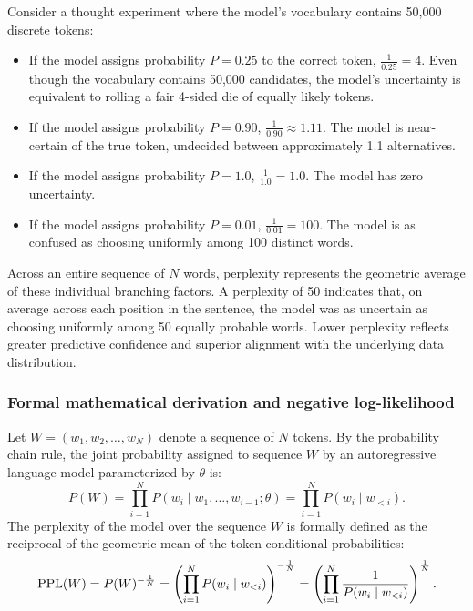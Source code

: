 \documentclass[../../../main.tex]{subfiles}
\begin{document}
Consider a thought experiment where the model's vocabulary contains 50,000 discrete tokens:
\begin{itemize}
    \item If the model assigns probability $P = 0.25$ to the correct token, $\frac{1}{0.25} = 4$. Even though the vocabulary contains 50,000 candidates, the model's uncertainty is equivalent to rolling a fair 4-sided die of equally likely tokens.
    \item If the model assigns probability $P = 0.90$, $\frac{1}{0.90} \approx 1.11$. The model is near-certain of the true token, undecided between approximately 1.1 alternatives.
    \item If the model assigns probability $P = 1.0$, $\frac{1}{1.0} = 1.0$. The model has zero uncertainty.
    \item If the model assigns probability $P = 0.01$, $\frac{1}{0.01} = 100$. The model is as confused as choosing uniformly among 100 distinct words.
\end{itemize}
Across an entire sequence of $N$ words, perplexity represents the geometric average of these individual branching factors. A perplexity of 50 indicates that, on average across each position in the sentence, the model was as uncertain as choosing uniformly among 50 equally probable words. Lower perplexity reflects greater predictive confidence and superior alignment with the underlying data distribution.

\subsubsection{Formal mathematical derivation and negative log-likelihood}
Let $W = (w_1, w_2, \dots, w_N)$ denote a sequence of $N$ tokens. By the probability chain rule, the joint probability assigned to sequence $W$ by an autoregressive language model parameterized by $\theta$ is:
\begin{equation}
\label{eq:joint_prob_chain_rule}
P(W) = \prod_{i=1}^N P(w_i \mid w_1, \dots, w_{i-1}; \theta) = \prod_{i=1}^N P(w_i \mid w_{<i}).
\end{equation}
The perplexity of the model over the sequence $W$ is formally defined as the reciprocal of the geometric mean of the token conditional probabilities:
\begin{equation}
\label{eq:perplexity_def_geom}
\mathrm{PPL}(W) = P(W)^{-\frac{1}{N}} = \left( \prod_{i=1}^N P(w_i \mid w_{<i}) \right)^{-\frac{1}{N}} = \left( \prod_{i=1}^N \frac{1}{P(w_i \mid w_{<i})} \right)^{\frac{1}{N}}.
\end{equation}
\end{document}
